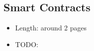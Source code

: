 \subsection{Smart Contracts}

\begin{itemize}
  \item Length: around 2 pages
  \item TODO:
\end{itemize}
